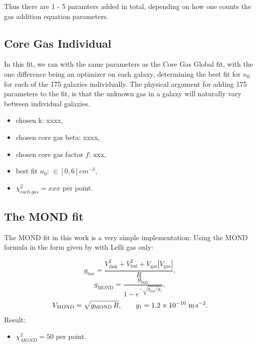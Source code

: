 \documentclass[fleqn,usenatbib]{mnras}
\begin{document}
Thus there are 1 - 5 paramters added in total, depending on how one counts the gas addition equation parameters. 

\subsection{Core Gas Individual}
In this fit, we ran with the same parameters as the Core Gas Global fit, with the one difference being an optimizer on each galaxy, determining the best fit for $n_0$ for each of the 175 galaxies individually. The physical argument for adding 175 parameters to the fit, is that the unknown gas in a galaxy will naturally vary between individual galaxies. 
\begin{itemize}
	\item chosen k: xxxx,
	\item chosen core gas beta: xxxx,
	\item chosen core gas factor $f$: xxx,
	\item best fit $n_0$: $\in [0, 6]cm^{-3}$,
	\item $\chi^2_{each\ gas} = xxx $ per point.
\end{itemize}



\subsection{The MOND fit}

The MOND fit in this work is a very simple implementation: Using the MOND formula in the form given by \citep{Lelli2017} with Lelli gas only:

\begin{equation}
    g_{\text{bar}} = \frac{V_{\text{disk}}^2 + V_{\text{bul}}^2 + V_{\text{gas}}|V_{\text{gas}}|}{R},
\end{equation}
\begin{equation}
    g_{\text{MOND}} = \frac{g_{\text{bar}}}{1 - e^{-\sqrt{g_{\text{bar}} / g_{\dagger}}}},
\end{equation}
\begin{equation}
    V_{\text{MOND}} = \sqrt{g_{\text{MOND}}\,R},
    \qquad
    g_{\dagger} = 1.2 \times 10^{-10}\ \text{m\,s}^{-2}.
\end{equation}
Result:
\begin{itemize}
	\item $\chi^2_{MOND} = 50 $ per point.
\end{itemize}
\end{document}
